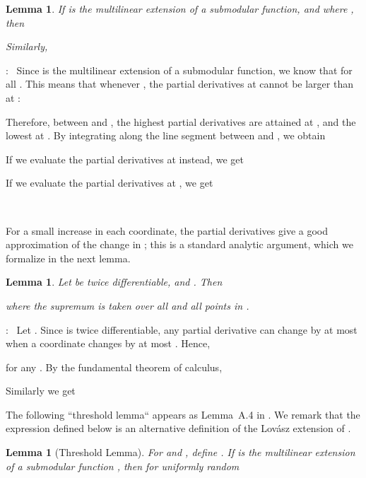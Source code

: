 \documentclass{article}[11pt]
\newtheorem{lemma}[theorem]{Lemma}
\renewenvironment{proof}{\noindent{\bf Proof}:~}{\\}
\begin{document}
\begin{lemma}
\label{lem:submod-change}
If  is the multilinear extension of a submodular function,
and  where , then

Similarly,

\end{lemma}

\begin{proof}
Since  is the multilinear extension of a submodular function,
we know that  for all  \cite{CCPV07}.
This means that whenever , the partial derivatives
at  cannot be larger than at :

Therefore, between  and , the highest partial derivatives
are attained at , and the lowest at .
By integrating along the line segment between  and , we obtain

If we evaluate the partial derivatives at  instead, we get

If we evaluate the partial derivatives at , we get

\end{proof}

For a small increase in each coordinate, the partial derivatives give
a good approximation of the change in ; this is a standard analytic argument,
which we formalize in the next lemma.

\begin{lemma}
\label{lem:Taylor}
Let  be twice differentiable,
 and . Then

 where the supremum is taken over all  and all points in .
\end{lemma}

\begin{proof}
Let .
Since  is twice differentiable, any partial derivative can change by at most
 when a coordinate changes by at most . Hence,

for any . By the fundamental theorem of calculus,

Similarly we get 
\end{proof}


The following ``threshold lemma`` appears as Lemma~A.4 in \cite{Vondrak09}.
We remark that the expression  defined below
is an alternative definition of the Lov\'asz extension of .

\begin{lemma}[Threshold Lemma]
\label{lem:threshold}
For  and , define . If  is the multilinear extension of a submodular
function , then for  uniformly random

\end{lemma}
\end{document}
